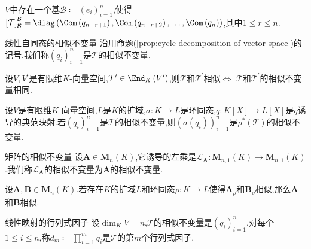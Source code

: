 \begin{remark}{}{}
	$V$中存在一个基$\mathcal{B}\coloneq\left(e_{i}\right)_{i=1}^{n}$,使得$\left[\mathcal{T}\right]_{\mathcal{B}}^{\mathcal{B}}=\diag\left(\Com\left(q_{n-r+1}\right),\Com\left(q_{n-r+2}\right),\ldots,\Com\left(q_{n}\right)\right)$,其中$1\leq r\leq n$.
\end{remark}

\begin{definition}{线性自同态的相似不变量}{}
	沿用命题(\ref{prop:cycle-decomposition-of-vector-space})的记号.我们称$\left(q_{i}\right)_{i=1}^{n}$是$\mathcal{T}$的相似不变量.
\end{definition}

\begin{corollary}{}{}
	设$V,V^{\prime}$是有限维$K$-向量空间,$\mathcal{T}^{\prime}\in\End_{K}\left(V^{\prime}\right)$,则$\mathcal{T}$和$\mathcal{T}^{\prime}$相似$\iff$ $\mathcal{T}$和$\mathcal{T}^{\prime}$的相似不变量相同.
\end{corollary}

\begin{corollary}{}{}
	设$V$是有限维$K$-向量空间,$L$是$K$的扩域,$\sigma:K\to L$是环同态,$\bar{q}:K[X]\to L[X]$是$q$诱导的典范映射.若$\left(q_{i}\right)_{i=1}^{n}$是$\mathcal{T}$的相似不变量,则$\left(\bar{\sigma}\left(q_{i}\right)\right)_{i=1}^{n}$是$\rho^{\ast}\left(\mathcal{T}\right)$的相似不变量.
\end{corollary}

\begin{definition}{矩阵的相似不变量}{}
	设$\boldsymbol{A}\in\mathbf{M}_{n}\left(K\right)$,它诱导的左乘是$\mathcal{L}_{\boldsymbol{A}}:\mathbf{M}_{n,1}\left(K\right)\to\mathbf{M}_{n,1}\left(K\right)$.我们称$\mathcal{L}_{\boldsymbol{A}}$的相似不变量为$\boldsymbol{A}$的相似不变量.
\end{definition}

\begin{corollary}{}{}
	设$\boldsymbol{A},\boldsymbol{B}\in\mathbf{M}_{n}\left(K\right)$.若存在$K$的扩域$L$和环同态$\rho:K\to L$使得$\boldsymbol{A}_{\rho}$和$\boldsymbol{B}_{\rho}$相似,那么$\boldsymbol{A}$和$\boldsymbol{B}$相似.
\end{corollary}

\begin{definition}{线性映射的行列式因子}{}
	设$\dim_{K}V=n$,$\mathcal{T}$的相似不变量是$\left(q_{i}\right)_{i=1}^{n}$.对每个$1\leq i\leq n$,称$d_{m}\coloneq\prod\limits_{i=1}^{m}q_{i}$是$\mathcal{T}$的第$m$个行列式因子.
\end{definition}

